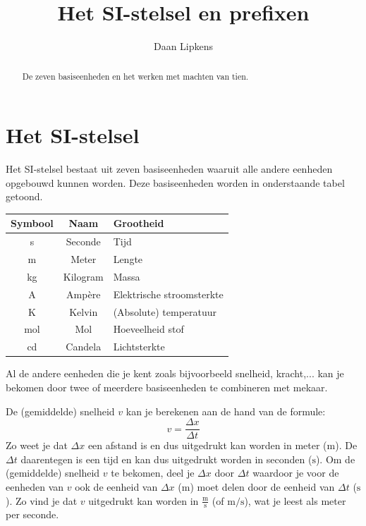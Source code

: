 \documentclass{ximera}
\title{Het SI-stelsel en prefixen}
\author{Daan Lipkens}
\begin{document}
\begin{abstract}
    De zeven basiseenheden en het werken met machten van tien.
\end{abstract}
\maketitle

\section{Het SI-stelsel}
Het SI-stelsel bestaat uit zeven basiseenheden waaruit alle andere eenheden opgebouwd kunnen worden. Deze basiseenheden worden in onderstaande tabel getoond.

\begin{center}
    \begin{tabular}{ |c|c|l| } 
    \hline
    \textbf{Symbool} & \textbf{Naam} & \textbf{Grootheid} \\
    \hline
    s & Seconde & Tijd \\
    \hline
    m & Meter & Lengte \\
    \hline
    kg & Kilogram & Massa \\
    \hline
    A & Ampère & Elektrische stroomsterkte \\
    \hline
    K & Kelvin & (Absolute) temperatuur \\
    \hline
    mol & Mol & Hoeveelheid stof \\
    \hline
    cd & Candela & Lichtsterkte \\
    \hline
    \end{tabular}
\end{center}

Al de andere eenheden die je kent zoals bijvoorbeeld snelheid, kracht,... kan je bekomen door twee of meerdere basiseenheden te combineren met mekaar.

\begin{example}[title={Gemiddelde Snelheid}]\nl
    De (gemiddelde) snelheid $v$ kan je berekenen aan de hand van de formule:
    \[ v = \frac{\Delta x}{\Delta t} \]
    Zo weet je dat $\Delta x$ een afstand is en dus uitgedrukt kan worden in meter ($\mathrm{m}$). De $\Delta t$ daarentegen is een tijd en kan dus uitgedrukt worden in seconden ($\mathrm{s}$). Om de (gemiddelde) snelheid $v$ te bekomen, deel je $\Delta x$ door $\Delta t$ waardoor je voor de eenheden van $v$ ook de eenheid van $\Delta x$ ($\mathrm{m}$) moet delen door de eenheid van $\Delta t$ ($\mathrm{s}$). Zo vind je dat $v$ uitgedrukt kan worden in $\mathrm{\frac{m}{s}}$ (of $\mathrm{m/s}$), wat je leest als meter per seconde.
\end{example}
\end{document}
